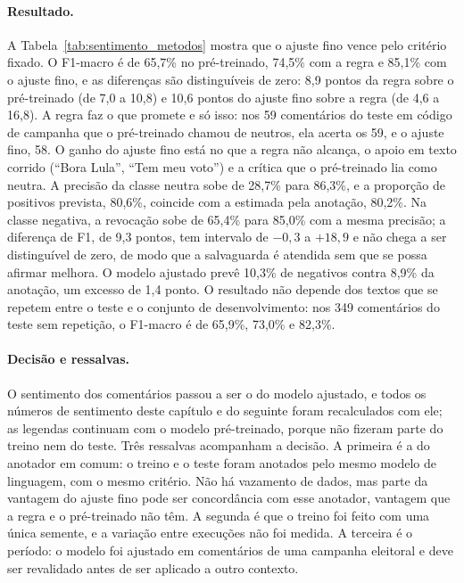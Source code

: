 \paragraph*{Resultado.} A Tabela~\ref{tab:sentimento_metodos} mostra que o ajuste fino vence pelo critério fixado. O F1-macro é de 65,7\% no pré-treinado, 74,5\% com a regra e 85,1\% com o ajuste fino, e as diferenças são distinguíveis de zero: 8,9 pontos da regra sobre o pré-treinado (de 7,0 a 10,8) e 10,6 pontos do ajuste fino sobre a regra (de 4,6 a 16,8). A regra faz o que promete e só isso: nos 59 comentários do teste em código de campanha que o pré-treinado chamou de neutros, ela acerta os 59, e o ajuste fino, 58. O ganho do ajuste fino está no que a regra não alcança, o apoio em texto corrido (``Bora Lula'', ``Tem meu voto'') e a crítica que o pré-treinado lia como neutra. A precisão da classe neutra sobe de 28,7\% para 86,3\%, e a proporção de positivos prevista, 80,6\%, coincide com a estimada pela anotação, 80,2\%. Na classe negativa, a revocação sobe de 65,4\% para 85,0\% com a mesma precisão; a diferença de F1, de 9,3 pontos, tem intervalo de $-0{,}3$ a $+18{,}9$ e não chega a ser distinguível de zero, de modo que a salvaguarda é atendida sem que se possa afirmar melhora. O modelo ajustado prevê 10,3\% de negativos contra 8,9\% da anotação, um excesso de 1,4 ponto. O resultado não depende dos textos que se repetem entre o teste e o conjunto de desenvolvimento: nos 349 comentários do teste sem repetição, o F1-macro é de 65,9\%, 73,0\% e 82,3\%.

\paragraph*{Decisão e ressalvas.} O sentimento dos comentários passou a ser o do modelo ajustado, e todos os números de sentimento deste capítulo e do seguinte foram recalculados com ele; as legendas continuam com o modelo pré-treinado, porque não fizeram parte do treino nem do teste. Três ressalvas acompanham a decisão. A primeira é a do anotador em comum: o treino e o teste foram anotados pelo mesmo modelo de linguagem, com o mesmo critério. Não há vazamento de dados, mas parte da vantagem do ajuste fino pode ser concordância com esse anotador, vantagem que a regra e o pré-treinado não têm. A segunda é que o treino foi feito com uma única semente, e a variação entre execuções não foi medida. A terceira é o período: o modelo foi ajustado em comentários de uma campanha eleitoral e deve ser revalidado antes de ser aplicado a outro contexto.


